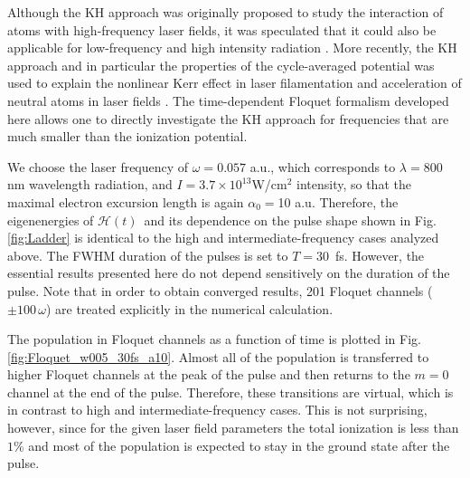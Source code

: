 \documentclass[
pra%
,preprint%
,amssymb, nobibnotes, aps, superscriptaddress, floatfix]{revtex4}
\newcommand{\fig}{Fig.\,}
\newcommand{\as}{\alpha}
\newcommand{\CAHt}{$\mathcal{H}(t)$}
\begin{document}
Although the KH approach was originally proposed to study the interaction of atoms with high-frequency laser fields, it was speculated that it could also be applicable for low-frequency and high intensity radiation \cite{Popov1999,Smirnova2000,Popov2011,Morales2011}. More recently, the KH approach and in particular the properties of the cycle-averaged potential was used to explain the nonlinear Kerr effect in laser filamentation \cite{Patchkovskii2013} and acceleration of neutral atoms in laser fields \cite{Wei2017}.
The time-dependent Floquet formalism developed here allows one to directly investigate the KH approach for frequencies that are much smaller than the ionization potential. 

We choose the laser frequency of $\omega=0.057$ a.u., which corresponds to $\lambda=800$ nm wavelength radiation, and $I=3.7 \times 10^{13}$W/cm$^2$ intensity, so that the maximal electron excursion length is again $\as_0=$10 a.u. Therefore, the eigenenergies of \CAHt\ and its dependence on the pulse shape shown in \fig \ref{fig:Ladder} is identical to the high and intermediate-frequency cases analyzed above. The FWHM duration of the pulses is set to $T=30$~fs. %
However, the essential results presented here do not depend sensitively on the duration of the pulse.
Note that in order to obtain converged results, 201 Floquet channels ($\pm 100 \, \omega$) are treated explicitly in the numerical calculation.

The population in Floquet channels as a function of time is plotted in \fig \ref{fig:Floquet_w005_30fs_a10}. 
Almost all of the population is transferred to higher Floquet channels at the peak of the pulse and then returns to the $m=0$ channel at the end of the pulse.
Therefore, these transitions are virtual, which is in contrast to high and intermediate-frequency cases. This is not surprising, however, since for the given laser field parameters the total ionization is less than $1\%$ and most of the population is expected to stay in the ground state after the pulse. 
\end{document}
